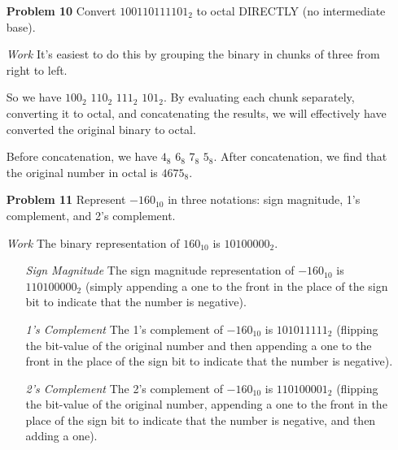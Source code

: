 \documentclass[12pt]{article}
\begin{document}
\begin{enumerate}
  \item[\textbf{Problem 10}] Convert $100110111101_2$ to octal DIRECTLY (no intermediate base).
\end{enumerate}

\begin{enumerate}
  \item[\textit{Work}] It's easiest to do this by grouping the binary in chunks of three from right to left.
  \item[] So we have $100_2$ $110_2$ $111_2$ $101_2$. By evaluating each chunk separately, converting it to octal, and concatenating the results, we will effectively have converted the original binary to octal.
  \item[] Before concatenation, we have $4_8$ $6_8$ $7_8$ $5_8$. After concatenation, we find that the original number in octal is $4675_8$.
\end{enumerate}


\begin{enumerate}
  \item[\textbf{Problem 11}] Represent $-160_{10}$ in three notations: sign magnitude, 1’s complement, and 2’s complement.
\end{enumerate}

\begin{enumerate}
  \item[\textit{Work}] The binary representation of $160_{10}$ is $10100000_2$.
  \begin{enumerate}
    \item[\textit{Sign Magnitude}] The sign magnitude representation of $-160_{10}$ is $110100000_2$ (simply appending a one to the front in the place of the sign bit to indicate that the number is negative).
    \item[\textit{1's Complement}] The 1's complement of $-160_{10}$ is $101011111_2$ (flipping the bit-value of the original number and then appending a one to the front in the place of the sign bit to indicate that the number is negative).
    \item[\textit{2's Complement}] The 2's complement of $-160_{10}$ is $110100001_2$ (flipping the bit-value of the original number, appending a one to the front in the place of the sign bit to indicate that the number is negative, and then adding a one).
  \end{enumerate}
\end{enumerate}
\end{document}
